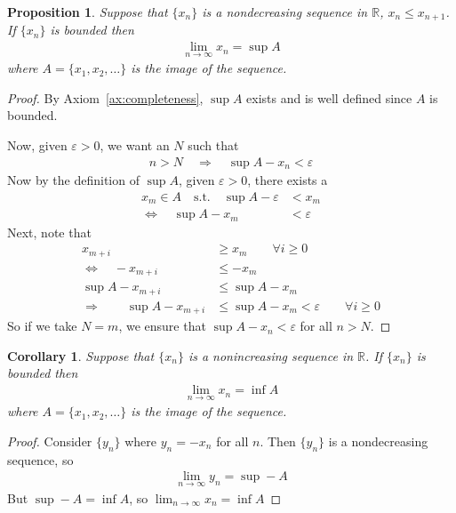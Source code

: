 \documentclass[12pt]{article}
\theoremstyle{plain}
\newtheorem{prop}[thm]{Proposition}
\newtheorem{cor}[thm]{Corollary}
\theoremstyle{definition}
\theoremstyle{remark}
\newcommand{\R}{\mathbb{R}}
\begin{document}
\begin{prop}
Suppose that $\{x_n\}$ is a nondecreasing sequence in $\R$, $x_n \leq
x_{n+1}$. If $\{x_n\}$ is bounded then
\begin{align*}
  \lim_{n\rightarrow \infty} x_n = \sup A
\end{align*}
where $A=\{x_1,x_2,\ldots\}$ is the image of the sequence.
\end{prop}
\begin{proof}
By Axiom~\ref{ax:completeness}, $\sup A$ exists and is well defined
since $A$ is bounded.

Now, given $\varepsilon>0$, we want an $N$ such that
\begin{align*}
  n>N\quad\Rightarrow\quad
  \sup A - x_n < \varepsilon
\end{align*}
Now by the definition of $\sup A$, given $\varepsilon>0$, there exists a
\begin{align*}
  x_m \in A
  \quad \text{s.t.} \quad
  \sup A - \varepsilon &< x_m\\
  \Leftrightarrow\quad
  \sup A - x_m&< \varepsilon
\end{align*}
Next, note that
\begin{align*}
  x_{m+i} &\geq x_m
  \qquad \forall i \geq 0 \\
  \Leftrightarrow\quad
  -x_{m+i} &\leq -x_m \\
  \sup A -x_{m+i} &\leq \sup A-x_m \\
  \Rightarrow \qquad
  \sup A -x_{m+i} &\leq \sup A-x_m < \varepsilon
  \qquad \forall i \geq 0
\end{align*}
So if we take $N=m$, we ensure that $\sup A - x_n< \varepsilon$ for all
$n>N$.
\end{proof}

\begin{cor}
\label{cor:nonincreasing}
Suppose that $\{x_n\}$ is a nonincreasing sequence in $\R$. If
$\{x_n\}$ is bounded then
\begin{align*}
  \lim_{n\rightarrow \infty} x_n = \inf A
\end{align*}
where $A=\{x_1,x_2,\ldots\}$ is the image of the sequence.
\end{cor}
\begin{proof}
Consider $\{y_n\}$ where $y_n = -x_n$ for all $n$. Then $\{y_n\}$ is a
nondecreasing sequence, so
\begin{align*}
  \lim_{n\rightarrow \infty} y_n = \sup -A
\end{align*}
But $\sup -A = \inf A$, so $\lim_{n\rightarrow \infty} x_n = \inf A$
\end{proof}
\end{document}
